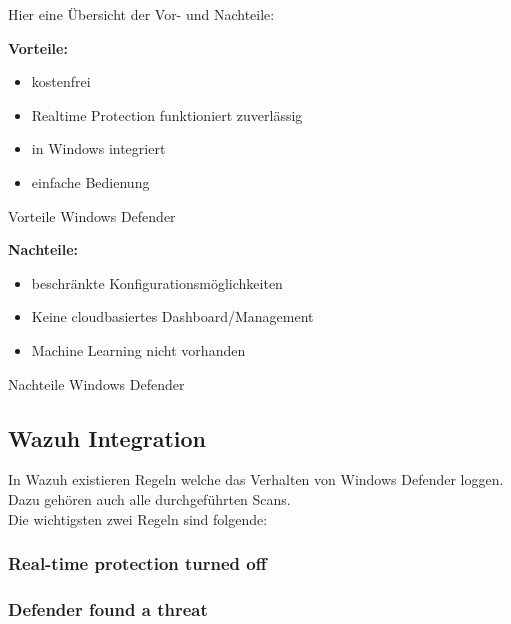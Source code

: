 Hier eine Übersicht der Vor- und Nachteile:\\

\begin{minipage}{\linewidth}
    \begin{multicols}{2}
        \begin{table}[H]
            \begin{center}
                \textbf{Vorteile:}
                \begin{itemize}
                    \item kostenfrei
                    \item Realtime Protection funktioniert zuverlässig
                    \item in Windows integriert
                    \item einfache Bedienung
                \end{itemize}
            \end{center}
            \caption{Vorteile Windows Defender}
        \end{table}
        \begin{table}[H]
            \begin{center}
                \textbf{Nachteile:}
                \begin{itemize}
                    \item beschränkte Konfigurationsmöglichkeiten
                    \item Keine cloudbasiertes Dashboard/Management
                    \item Machine Learning nicht vorhanden
                \end{itemize}
            \end{center}
            \caption{Nachteile Windows Defender}
        \end{table}
    \end{multicols}
\end{minipage}




\subsection{Wazuh Integration}
In Wazuh existieren Regeln welche das Verhalten von Windows Defender loggen.
Dazu gehören auch alle durchgeführten Scans.\\

Die wichtigsten zwei Regeln sind folgende:\\
\subsubsection{Real-time protection turned off}
\subsubsection{Defender found a threat}